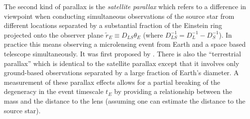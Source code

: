 \documentclass[12pt,dvipsnames]{report}
\begin{document}
The second kind of parallax is the \emph{satellite parallax} which refers to a
difference in viewpoint when conducting simultaneous observations of the source
star from different locations separated by a substantial fraction of the
Einstein ring projected onto the observer plane $\tilde{r}_E\equiv
    D_{LS}\theta_E$ (where $D_{LS}^{-1}=D_L^{-1} - D_S^{-1}$). In practice this
means observing a microlensing event from Earth and a space based telescope
simultaneously. It was first proposed by \citet{1966MNRAS.134..315R}. There is
also the ``terrestrial parallax'' which is identical to the satellite parallax
except that it involves only ground-based observations separated by a large
fraction of Earth's diameter. A measurement of these parallax effects allows
for a partial breaking of the degeneracy in the event timescale $t_E$ by
providing a relationship between the mass and the distance to the lens
(assuming one can estimate the distance to the source star).
\end{document}
